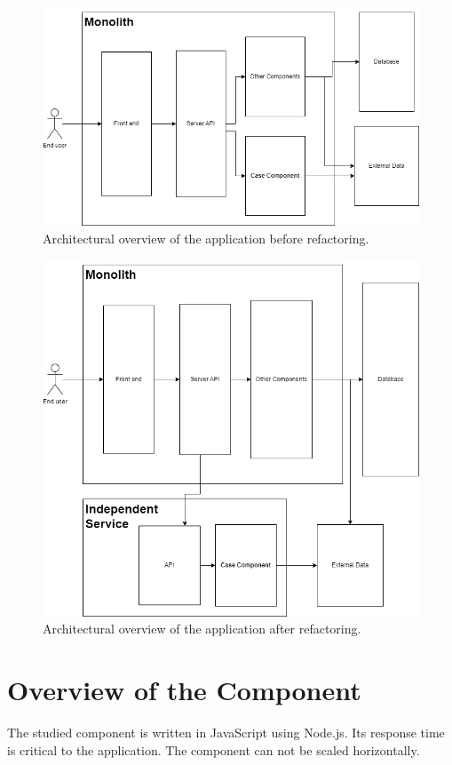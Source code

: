 \begin{figure}
    \includegraphics[width=\textwidth]{images/monolith_architecture.png}
    \caption{Architectural overview of the application before refactoring.}
    \label{figure:architecture:monolith}
\end{figure}
\begin{figure}
    \includegraphics[width=\textwidth]{images/independent_service_arcitecture.png}
    \caption{Architectural overview of the application after refactoring.}
    \label{figure:architecture:independent_service}
\end{figure}


\section{Overview of the Component}
The studied component is written in JavaScript using Node.js.
Its response time is critical to the application.
The component can not be scaled horizontally.


